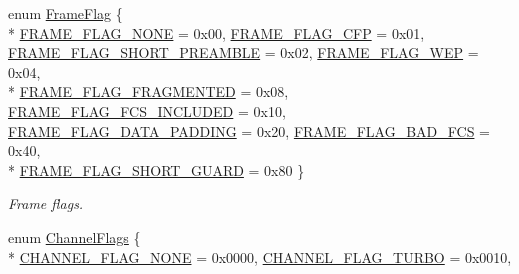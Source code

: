\begin{DoxyCompactItemize}
\item 
enum \hyperlink{classns3_1_1RadiotapHeader_a4375e57b5815a2ac2d6cfe4ca0c703d4}{Frame\+Flag} \{ \\*
\hyperlink{classns3_1_1RadiotapHeader_a4375e57b5815a2ac2d6cfe4ca0c703d4ac603854554c27b36d25257eafa37b896}{F\+R\+A\+M\+E\+\_\+\+F\+L\+A\+G\+\_\+\+N\+O\+NE} = 0x00, 
\hyperlink{classns3_1_1RadiotapHeader_a4375e57b5815a2ac2d6cfe4ca0c703d4a70335c3bfdf5ec24f8be46d4c16d1e6a}{F\+R\+A\+M\+E\+\_\+\+F\+L\+A\+G\+\_\+\+C\+FP} = 0x01, 
\hyperlink{classns3_1_1RadiotapHeader_a4375e57b5815a2ac2d6cfe4ca0c703d4a654ebb50af85aaaee342f7939782efd1}{F\+R\+A\+M\+E\+\_\+\+F\+L\+A\+G\+\_\+\+S\+H\+O\+R\+T\+\_\+\+P\+R\+E\+A\+M\+B\+LE} = 0x02, 
\hyperlink{classns3_1_1RadiotapHeader_a4375e57b5815a2ac2d6cfe4ca0c703d4a76712088760e63434a5cdcdaefd5836c}{F\+R\+A\+M\+E\+\_\+\+F\+L\+A\+G\+\_\+\+W\+EP} = 0x04, 
\\*
\hyperlink{classns3_1_1RadiotapHeader_a4375e57b5815a2ac2d6cfe4ca0c703d4a016af74bb12effca576c410dc0a12aa0}{F\+R\+A\+M\+E\+\_\+\+F\+L\+A\+G\+\_\+\+F\+R\+A\+G\+M\+E\+N\+T\+ED} = 0x08, 
\hyperlink{classns3_1_1RadiotapHeader_a4375e57b5815a2ac2d6cfe4ca0c703d4abe8c5f484aba9e96a66a47cdf75324db}{F\+R\+A\+M\+E\+\_\+\+F\+L\+A\+G\+\_\+\+F\+C\+S\+\_\+\+I\+N\+C\+L\+U\+D\+ED} = 0x10, 
\hyperlink{classns3_1_1RadiotapHeader_a4375e57b5815a2ac2d6cfe4ca0c703d4aa5e58dc045e024290bcf1bc1ab70ce1e}{F\+R\+A\+M\+E\+\_\+\+F\+L\+A\+G\+\_\+\+D\+A\+T\+A\+\_\+\+P\+A\+D\+D\+I\+NG} = 0x20, 
\hyperlink{classns3_1_1RadiotapHeader_a4375e57b5815a2ac2d6cfe4ca0c703d4a056df6170656cc4856529f7ad99a8c88}{F\+R\+A\+M\+E\+\_\+\+F\+L\+A\+G\+\_\+\+B\+A\+D\+\_\+\+F\+CS} = 0x40, 
\\*
\hyperlink{classns3_1_1RadiotapHeader_a4375e57b5815a2ac2d6cfe4ca0c703d4a6656cb9084d29627022e94f04a1f0e0c}{F\+R\+A\+M\+E\+\_\+\+F\+L\+A\+G\+\_\+\+S\+H\+O\+R\+T\+\_\+\+G\+U\+A\+RD} = 0x80
 \}\begin{DoxyCompactList}\small\item\em Frame flags. \end{DoxyCompactList}
\item 
enum \hyperlink{classns3_1_1RadiotapHeader_a26df5fbb86499c692bd97a99781c8140}{Channel\+Flags} \{ \\*
\hyperlink{classns3_1_1RadiotapHeader_a26df5fbb86499c692bd97a99781c8140a965988b53ecca2bea0a143c89b82961a}{C\+H\+A\+N\+N\+E\+L\+\_\+\+F\+L\+A\+G\+\_\+\+N\+O\+NE} = 0x0000, 
\hyperlink{classns3_1_1RadiotapHeader_a26df5fbb86499c692bd97a99781c8140a1c95a8c359744ccf3425e503175a6eda}{C\+H\+A\+N\+N\+E\+L\+\_\+\+F\+L\+A\+G\+\_\+\+T\+U\+R\+BO} = 0x0010, 

\end{DoxyCompactItemize}
